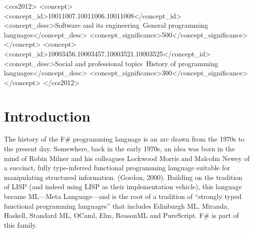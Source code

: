 \documentclass[acmsmall]{acmart}\settopmatter{}
\begin{document}
\begin{CCSXML}
<ccs2012>
<concept>
<concept_id>10011007.10011006.10011008</concept_id>
<concept_desc>Software and its engineering~General programming languages</concept_desc>
<concept_significance>500</concept_significance>
</concept>
<concept>
<concept_id>10003456.10003457.10003521.10003525</concept_id>
<concept_desc>Social and professional topics~History of programming languages</concept_desc>
<concept_significance>300</concept_significance>
</concept>
</ccs2012>
\end{CCSXML}





\maketitle


\section*{Introduction}

The history of the F\# programming language is an arc drawn from the 1970s to the present day.  Somewhere, back in
the early 1970s, an idea was born in the mind of Robin Milner and his colleagues Lockwood Morris and Malcolm Newey of a
succinct, fully type-inferred functional programming language suitable for manipulating structured information. (Gordon, 2000).  Building
on the tradition of LISP (and indeed using LISP as their implementation vehicle), this language became ML---Meta Language---and
is the root of a tradition of “strongly typed functional programming languages” that includes Edinburgh ML, Miranda, Haskell,
Standard ML, OCaml, Elm, ReasonML and PureScript. F\# is part of this family.
\end{document}
